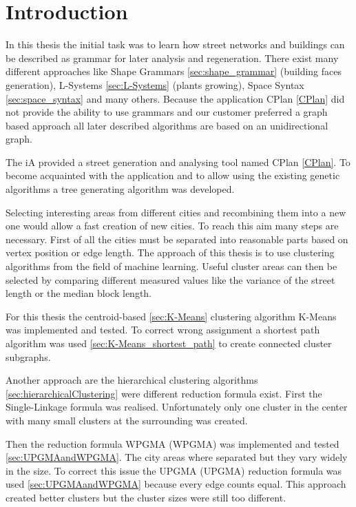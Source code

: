 \chapter{Introduction}
In this thesis the initial task was to learn how street networks and buildings can be described as grammar for later analysis and regeneration. There exist many different approaches like Shape Grammars \ref{sec:shape_grammar} (building faces generation), L-Systems \ref{sec:L-Systems} (plants growing), Space Syntax \ref{sec:space_syntax} and many others. 
Because the application CPlan \ref{CPlan} did not provide the ability to use grammars and our customer preferred a graph based approach all later described algorithms are based on an unidirectional graph.

The \gls{iA} provided a street generation and analysing tool named CPlan \ref{CPlan}. To become acquainted with the application and to allow using the existing genetic algorithms a tree generating algorithm was developed.

Selecting interesting areas from different cities and recombining them into a new one would allow a fast creation of new cities. To reach this aim many steps are necessary. First of all the cities must be separated into reasonable parts based on vertex position or edge length. The approach of this thesis is to use clustering algorithms from the field of machine learning. Useful cluster areas can then be selected by comparing different measured values like the variance of the street length or the median block length.

For this thesis the centroid-based \ref{sec:K-Means} clustering algorithm K-Means was implemented and tested. To correct wrong assignment a shortest path algorithm was used \ref{sec:K-Means_shortest_path} to create connected cluster subgraphs.

Another approach are the hierarchical clustering algorithms \ref{sec:hierarchicalClustering} were different reduction formula exist. First the Single-Linkage formula was realised. Unfortunately only one cluster in the center with many small clusters at the surrounding was created.

\newpage

Then the reduction formula \acrshort{WPGMA} (\acrlong{WPGMA}) was implemented and tested \ref{sec:UPGMAandWPGMA}. The city areas where separated but they vary widely in the size. To correct this issue the \acrshort{UPGMA} (\acrlong{UPGMA}) reduction formula was used \ref{sec:UPGMAandWPGMA} because every edge counts equal. This approach created better clusters but the cluster sizes were still too different.

